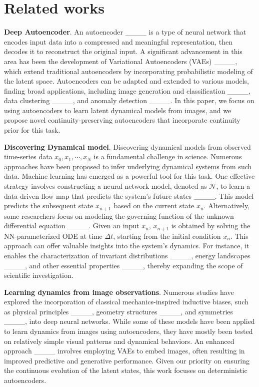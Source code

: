 \section{Related works}
\textbf{Deep Autoencoder}.
An autoencoder ____ is a type of neural network that encodes input data into a compressed and meaningful representation, then decodes it to reconstruct the original input. A significant advancement in this area has been the development of Variational Autoencoders (VAEs) ____, which extend traditional autoencoders by incorporating probabilistic modeling of the latent space. Autoencoders can be adapted and extended to various models, finding broad applications, including image generation and classification ____, data clustering ____, and anomaly detection ____. In this paper, we focus on using autoencoders to learn latent dynamical models from images, and we propose novel continuity-preserving autoencoders that incorporate continuity prior for this task.

\textbf{Discovering Dynamical model}.
Discovering dynamical models from observed time-series data ${x_0, x_1,\cdots, x_N}$ is a fundamental challenge in science. Numerous approaches have been proposed to infer underlying dynamical systems from such data. Machine learning has emerged as a powerful tool for this task. One effective strategy involves constructing a neural network model, denoted as $\mathcal{N}$, to learn a data-driven flow map that predicts the system's future states ____. This model predicts the subsequent state $x_{n+1}$ based on the current state $x_n$. Alternatively, some researchers focus on modeling the governing function of the unknown differential equation ____. Given an input $x_n$, $x_{n+1}$ is obtained by solving the NN-parameterized ODE at time $\Delta t$, starting from the initial condition $x_n$.  This approach can offer valuable insights into the system's dynamics. For instance, it enables the characterization of invariant distributions ____, energy landscapes ____, and other essential properties ____, thereby expanding the scope of scientific investigation.

\textbf{Learning dynamics from image observations}.
Numerous studies have explored the incorporation of classical mechanics-inspired inductive biases, such as physical principles ____, geometry structures ____, and symmetries ____, into deep neural networks. While some of these models have been applied to learn dynamics from images using autoencoders, they have mostly been tested on relatively simple visual patterns and dynamical behaviors.
An enhanced approach ____ involves employing VAEs to embed images, often resulting in improved predictive and generative performance. Given our priority on ensuring the continuous evolution of the latent states, this work focuses on deterministic autoencoders.

